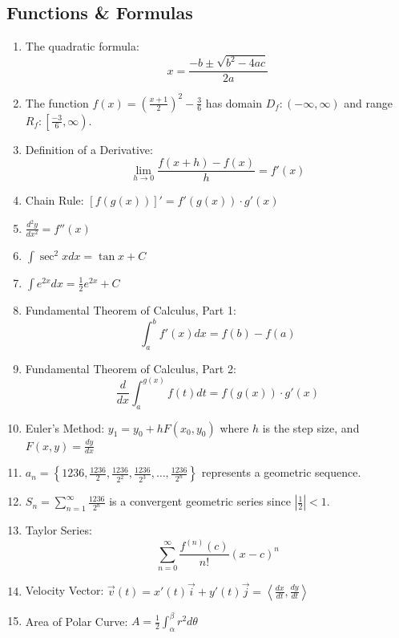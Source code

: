 \documentclass[12pt]{article}
\begin{document}
\subsection{Functions \& Formulas}
\begin{enumerate}
    \item The quadratic formula:
    \[
    x = \frac{-b \pm \sqrt{b^2 - 4ac}}{2a}
    \]
    
    \item The function $f(x) = \left(\frac{x+1}{2}\right)^2 - \frac{3}{6}$ has domain $D_f: (-\infty, \infty)$ and range $R_f: \left[\frac{-3}{6}, \infty\right)$.
    
    \item Definition of a Derivative: 
    \[
    \lim_{h \to 0} \frac{f(x+h) - f(x)}{h} = f'(x)
    \]
    
    \item Chain Rule: $[f(g(x))]' = f'(g(x)) \cdot g'(x)$
    
    \item $\frac{d^2y}{dx^2} = f''(x)$
    
    \item $\int \sec^2 x dx = \tan x + C$
 \item $\int e^{2x} dx = \frac{1}{2}e^{2x} + C$
    
    \item Fundamental Theorem of Calculus, Part 1:
    \[
    \int_{a}^{b} f'(x) dx = f(b) - f(a)
    \]
    
    \item Fundamental Theorem of Calculus, Part 2:
    \[
    \frac{d}{dx} \int_{a}^{g(x)} f(t) dt = f(g(x)) \cdot g'(x)
    \]
    
    \item Euler's Method: $y_1 = y_0 + hF(x_0, y_0)$ where $h$ is the step size, and $F(x, y) = \frac{dy}{dx}$
    
    \item $a_n = \left\{1236, \frac{1236}{2}, \frac{1236}{2^2}, \frac{1236}{2^3}, \ldots, \frac{1236}{2^n}\right\}$ represents a geometric sequence.
    
    \item $S_n = \sum_{n=1}^{\infty} \frac{1236}{2^n}$ is a convergent geometric series since $\left|\frac{1}{2}\right| < 1$.
    
    \item Taylor Series:
    \[
    \sum_{n=0}^{\infty} \frac{f^{(n)}(c)}{n!} (x - c)^n
    \]
    
    \item Velocity Vector: $\vec{v}(t) = x'(t)\vec{i} + y'(t)\vec{j} = \left\langle \frac{dx}{dt}, \frac{dy}{dt} \right\rangle$
    
    \item Area of Polar Curve: $A = \frac{1}{2} \int_{\alpha}^{\beta} r^2 d\theta$
\end{enumerate}
\newpage
\end{document}
